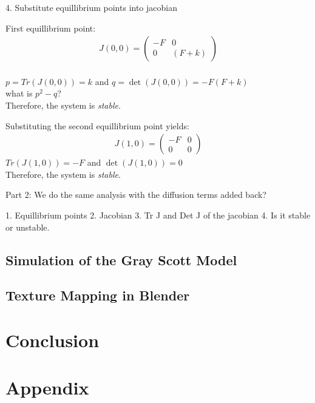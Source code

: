 \documentclass[a4paper, 11pt]{article}
\begin{document}
4. Substitute equillibrium points into jacobian

First equillibrium point:
\begin{align*}
	J(0, 0) = \begin{pmatrix}
		          -F & 0       \\
		          0  & (F + k)
	          \end{pmatrix}
\end{align*} \\

$p = Tr(J(0,0)) = k$  and  $q = \det(J(0,0)) = -F(F + k)$ \\
what is $p^2 - q$? \\
 Therefore, the system is \emph{stable}.



Substituting the second equillibrium point yields:
\begin{align*}
	J(1, 0) = \begin{pmatrix}
		          -F & 0 \\
		          0  & 0
	          \end{pmatrix}
\end{align*}
$Tr(J(1,0)) = -F$  and  $\det(J(1,0)) = 0$ \\
Therefore, the system is \emph{stable}.



Part 2: We do the same analysis with the diffusion terms added back?

1. Equillibrium points
2. Jacobian
3. Tr J and Det J of the jacobian
4. Is it stable or unstable.

\subsection{Simulation of the Gray Scott Model}
\label{sec:numerical}
\subsection{Texture Mapping in Blender}



\section{Conclusion}
\label{sec:conclusion}

\printbibliography


\section{Appendix}
\end{document}
